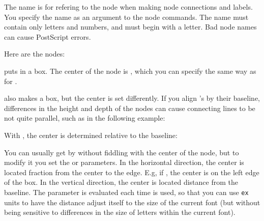 \documentclass[fontsize=11pt,english,BCOR=10mm,DIV=12,bibliography=totoc,parskip=false,headings=small,
    headinclude=false,footinclude=false,oneside]{pst-doc}
\begin{document}
The\XInfoDanger[0]{} name is for refering to the node when making node connections and labels.
You specify the name as an argument to the node commands. The name must
contain only letters and numbers, and must begin with a letter. Bad node names
can cause PostScript errors.




Here are the nodes:

\begin{BDef}
\end{BDef}

   puts  in a box. The center of the node is , which
you can specify the same way as for .

\begin{BDef}
\end{BDef}

   also makes a box, but the center is set differently. If you align
's by their baseline, differences in the height and depth of the nodes
can cause connecting lines to be not quite parallel, such as in the following
example:

\begin{LTXexample}[width=0.4\linewidth]
  \Large
   \hskip 2cm 
\end{LTXexample}

With , the center is determined relative to the baseline:

\begin{LTXexample}[width=0.4\linewidth]
  \Large
   \hskip 2cm 
\end{LTXexample}

You can usually get by without fiddling with the center of the node, but to
modify it you set the
   or 
parameters. In the horizontal direction, the center is located fraction
 from the center to the edge. E.g, if , the center is on
the left edge of the box. In the vertical direction, the center is located
distance  from the baseline. The  parameter is evaluated each
time  is used, so that you can use \verb|ex| units to have the distance
adjust itself to the size of the current font (but without being sensitive to
differences in the size of letters within the current font).
\end{document}
